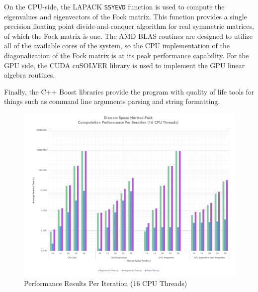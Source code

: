 \documentclass[conference, twoside]{IEEEtran}
\begin{document}
On the CPU-side, the LAPACK \texttt{SSYEVD} function is used to compute the eigenvalues and eigenvectors of the Fock matrix. This function provides a single precision floating point divide-and-conquer algorithm for real symmetric matrices, of which the Fock matrix is one. The AMD BLAS routines are designed to utilize all of the available cores of the system, so the CPU implementation of the diagonalization of the Fock matrix is at its peak performance capability. For the GPU side, the CUDA cuSOLVER library is used to implement the GPU linear algebra routines.

Finally, the C++ Boost libraries provide the program with quality of life tools for things such as command line arguments parsing and string formatting.

\begin{figure}[ht] %
\centering
\includegraphics[width=7in]{figures/sixteen-core-results.pdf}
\caption{Performance Results Per Iteration (16 CPU Threads)}
\label{perf-results-per-iteration-sixteen-core}
\end{figure}
\end{document}

